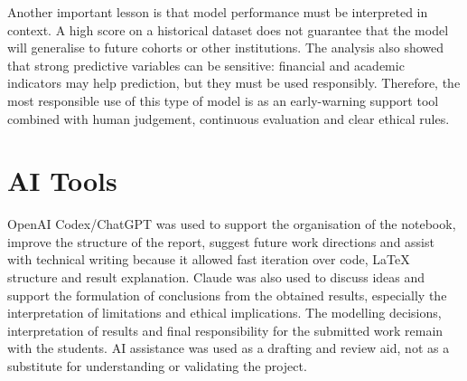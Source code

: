\documentclass[conference]{IEEEtran}
\begin{document}
Another important lesson is that model performance must be interpreted in context. A high score on a historical dataset does not guarantee that the model will generalise to future cohorts or other institutions. The analysis also showed that strong predictive variables can be sensitive: financial and academic indicators may help prediction, but they must be used responsibly. Therefore, the most responsible use of this type of model is as an early-warning support tool combined with human judgement, continuous evaluation and clear ethical rules.

\section{AI Tools}
OpenAI Codex/ChatGPT was used to support the organisation of the notebook, improve the structure of the report, suggest future work directions and assist with technical writing because it allowed fast iteration over code, LaTeX structure and result explanation. Claude was also used to discuss ideas and support the formulation of conclusions from the obtained results, especially the interpretation of limitations and ethical implications. The modelling decisions, interpretation of results and final responsibility for the submitted work remain with the students. AI assistance was used as a drafting and review aid, not as a substitute for understanding or validating the project.
\end{document}
